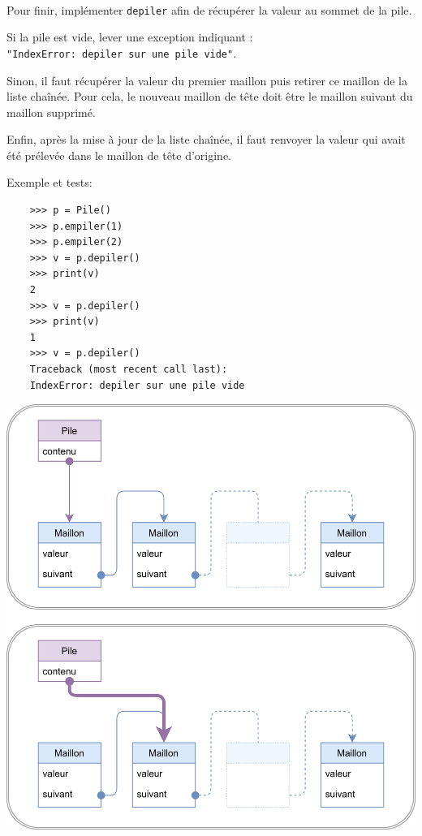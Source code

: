 \documentclass[a4paper,17pt]{extarticle}
\let\origfigure\figure
\let\endorigfigure\endfigure
\renewenvironment{figure}[1][2] {
    \expandafter\origfigure\expandafter[H]
} {
    \endorigfigure
}
\newenvironment{eleve}%
{\begin{activite}\color{noiramu}\\[-0.5cm]}
{\end{activite}}
\begin{document}
\begin{eleve}
    Pour finir, implémenter \texttt{depiler} afin de récupérer la valeur au
sommet de la pile.

Si la pile est vide, lever une exception indiquant :
\texttt{"IndexError:\ depiler\ sur\ une\ pile\ vide"}.

Sinon, il faut récupérer la valeur du premier maillon puis retirer ce
maillon de la liste chaînée. Pour cela, le nouveau maillon de tête doit
être le maillon suivant du maillon supprimé.

Enfin, après la mise à jour de la liste chaînée, il faut renvoyer la
valeur qui avait été prélevée dans le maillon de tête d'origine.

Exemple et tests:

\begin{verbatim}
    >>> p = Pile()
    >>> p.empiler(1)
    >>> p.empiler(2)
    >>> v = p.depiler()
    >>> print(v)
    2
    >>> v = p.depiler()
    >>> print(v)
    1
    >>> v = p.depiler()
    Traceback (most recent call last):
    IndexError: depiler sur une pile vide
\end{verbatim}
        
        \end{eleve}
    \begin{figure}
\centering
\includegraphics{img-depiler.png}
\caption{Algorithme pour depiler}
\end{figure}
\end{document}
